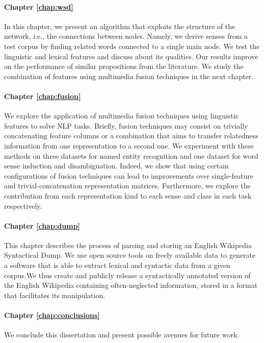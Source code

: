 \paragraph{Chapter \ref{chap:wsd}} In this chapter, we present an algorithm that exploits the structure of the network, i.e., the connections between nodes. Namely, we derive senses from a test corpus by finding related words connected to a single main node. We test the linguistic and lexical features and discuss about its qualities. Our results improve on the performance of similar propositions from the literature. We study the combination of features using multimedia fusion techniques in the next chapter.

\paragraph{Chapter \ref{chap:fusion}} We explore the application of multimedia fusion techniques using linguistic features to solve NLP tasks. Briefly, fusion techniques may consist on trivially concatenating feature columns or a combination that aims to transfer relatedness information from one representation to a second one. We experiment with these methods on three datasets for named entity recognition and one dataset for word sense induction and disambiguation. Indeed, we show that using certain configurations of fusion techniques can lead to improvements over single-feature and trivial-concatenation representation matrices. Furthermore, we explore the contribution from each representation kind to each sense and class in each task respectively.
\paragraph{Chapter \ref{chap:dump}} This chapter describes the process of parsing and storing an English Wikipedia Syntactical Dump. We use open source tools on freely available data to generate a software that is able to extract lexical and syntactic data from a given corpus.We thus create and publicly release a syntactically annotated version of the English Wikipedia containing often-neglected information, stored in a format that facilitates its manipulation. 

\paragraph{Chapter \ref{chap:conclusions}} We conclude this dissertation and present possible avenues for future work.


